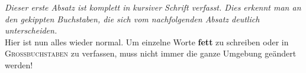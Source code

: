 \documentclass[a4paper]{article}
\begin{document}
 \noindent
\textit{Dieser  erste  Absatz  ist  komplett  in  kursiver  Schrift  verfasst.  Dies  erkennt  man  an  den  gekippten Buchstaben,  die  sich  vom  nachfolgenden  Absatz  deutlich  unterscheiden.} \\ Hier  ist  nun  alles  wieder  normal.  Um  einzelne  Worte \textbf{fett} zu  schreiben  oder in  \textsc{Großbuchstaben} zu  verfassen,  muss  nicht  immer  die  ganze  Umgebung  geändert  werden!
\end{document}
